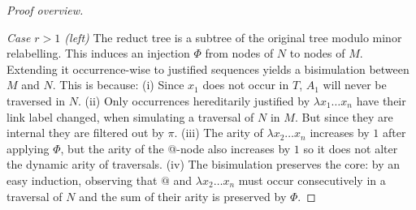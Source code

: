 \documentclass[xchauthor,chkrefs,GCNS,amsmath,amsthm,rotating,leaveRGB]{tcsg}
\theoremstyle{plain}
\theoremstyle{definition}
\def\coresymbol{\pi}
\begin{document}
\begin{proof}[Proof overview]
\begin{center}
            \end{center}
\noindent \emph{Case $r>1$ (left)} The reduct tree is a subtree of the
original tree modulo minor relabelling. This induces an injection $\Phi $
from nodes of $N$ to nodes of $M$. Extending it occurrence-wise to justified
sequences yields a bisimulation between $M$ and $N$. This is because: (i)
Since $x_{1}$ does not occur in $T$, $A_{1}$ will never be traversed in $N$.
(ii) Only occurrences hereditarily justified by $\lambda x_{1} \ldots x_{n}$
have their link label changed, when simulating a traversal of $N$ in $M$. But
since they are internal they are filtered out by $\coresymbol $. (iii) The
arity of $\lambda x_{2} \ldots x_{n}$ increases by $1$ after applying $\Phi
$, but the arity of the @-node also increases by $1$ so it does not alter the
dynamic arity of traversals. (iv) The bisimulation preserves the core: by an
easy induction, observing that $@$ and $\lambda x_{2}\ldots x_{n}$ must occur
consecutively in a traversal of $N$ and the sum of their arity is preserved
by $\Phi $.


\end{proof}
\end{document}
